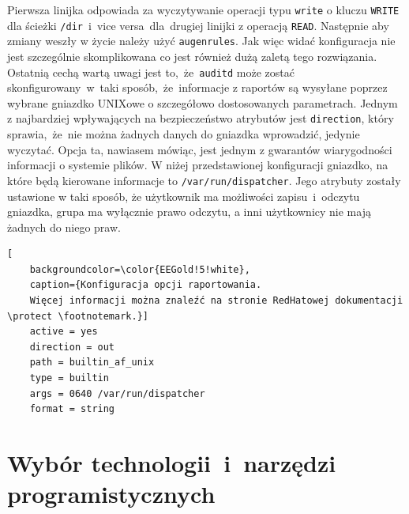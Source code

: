 Pierwsza linijka odpowiada za wyczytywanie operacji typu \texttt{write} o kluczu \texttt{WRITE} dla ścieżki \texttt{/dir}~i~vice versa~dla~drugiej linijki z operacją \texttt{READ}. Następnie aby zmiany weszły w życie należy użyć \texttt{augenrules}. Jak więc widać konfiguracja nie jest szczególnie skomplikowana co jest również dużą zaletą tego rozwiązania. 
\newline
Ostatnią cechą wartą uwagi jest to,~że~\texttt{auditd} może zostać skonfigurowany~w~taki sposób,~że~informacje z raportów są wysyłane poprzez wybrane gniazdko UNIXowe o szczegółowo dostosowanych parametrach. Jednym z najbardziej wpływających na bezpieczeństwo atrybutów jest \texttt{direction}, który sprawia,~że~nie można żadnych danych do gniazdka wprowadzić, jedynie wyczytać. Opcja ta, nawiasem mówiąc, jest jednym z gwarantów wiarygodności informacji o systemie plików. W niżej przedstawionej konfiguracji gniazdko, na które będą kierowane informacje to \texttt{/var/run/dispatcher}. Jego atrybuty zostały ustawione w taki sposób, że użytkownik ma możliwości zapisu~i~odczytu gniazdka, grupa ma wyłącznie prawo odczytu, a inni użytkownicy nie mają żadnych do niego praw.
\begin{lstlisting}[
    backgroundcolor=\color{EEGold!5!white},
    caption={Konfiguracja opcji raportowania. 
    Więcej informacji można znaleźć na stronie RedHatowej dokumentacji \protect \footnotemark.}]
    active = yes
    direction = out
    path = builtin_af_unix
    type = builtin
    args = 0640 /var/run/dispatcher
    format = string
\end{lstlisting}
\newpage

\section{Wybór technologii~i~narzędzi programistycznych}
